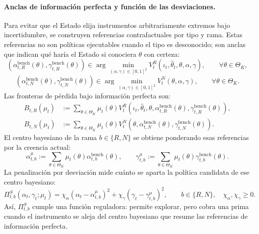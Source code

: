 \documentclass[12pt]{article}
\theoremstyle{definition}
\theoremstyle{remark}
\newcommand{\1}{\mathbf{1}}
\begin{document}
\paragraph{Anclas de información perfecta y función de las desviaciones.}
Para evitar que el Estado elija instrumentos arbitrariamente extremos bajo incertidumbre, se construyen referencias contrafactuales por tipo y rama. Estas referencias no son políticas ejecutables cuando el tipo es desconocido; son anclas que indican qué haría el Estado si conociera $\theta$ con certeza:
\begin{equation}
\label{eq:benchmark-rescue-type}
(\alpha_{t,R}^{\mathrm{bench}}(\theta),\gamma_{t,R}^{\mathrm{bench}}(\theta))
\in
\arg\min_{(\alpha,\gamma)\in[0,1]^2}
V_t^R(\iota_t,\hat{\theta}_t,\theta,\alpha,\gamma),
\qquad \forall\theta\in\Theta_K,
\end{equation}
\begin{equation}
\label{eq:benchmark-neg-type}
(\alpha_{t,N}^{\mathrm{bench}}(\theta),\gamma_{t,N}^{\mathrm{bench}}(\theta))
\in
\arg\min_{(\alpha,\gamma)\in[0,1]^2}
V_t^N(\theta,\alpha,\gamma),
\qquad \forall\theta\in\Theta_K.
\end{equation}
Las fronteras de pérdida bajo información perfecta son:
\begin{equation}
\label{eq:benchmark-perfect-info}
\begin{aligned}
B_{t,R}(\mu_t)
&:=
\sum_{\theta\in\Theta_K}\mu_t(\theta)
V_t^R\!\left(\iota_t,\hat{\theta}_t,\theta,
\alpha_{t,R}^{\mathrm{bench}}(\theta),
\gamma_{t,R}^{\mathrm{bench}}(\theta)\right),\\
B_{t,N}(\mu_t)
&:=
\sum_{\theta\in\Theta_K}\mu_t(\theta)
V_t^N\!\left(\theta,
\alpha_{t,N}^{\mathrm{bench}}(\theta),
\gamma_{t,N}^{\mathrm{bench}}(\theta)\right).
\end{aligned}
\end{equation}
El centro bayesiano de la rama $b\in\{R,N\}$ se obtiene ponderando esas referencias por la creencia actual:
\begin{equation}
\label{eq:belief-weighted-policy}
\alpha_{t,b}^{\mu}
:=
\sum_{\theta\in\Theta_K}\mu_t(\theta)\alpha_{t,b}^{\mathrm{bench}}(\theta),
\qquad
\gamma_{t,b}^{\mu}
:=
\sum_{\theta\in\Theta_K}\mu_t(\theta)\gamma_{t,b}^{\mathrm{bench}}(\theta).
\end{equation}
La penalización por desviación mide cuánto se aparta la política candidata de ese centro bayesiano:
\begin{equation}
\label{eq:prima-desviacion}
\Pi_{t,b}^S(\alpha_t,\gamma_t;\mu_t)
=
\chi_\alpha(\alpha_t-\alpha_{t,b}^{\mu})^2
+\chi_\gamma(\gamma_t-\gamma_{t,b}^{\mu})^2,
\qquad b\in\{R,N\},\quad \chi_\alpha,\chi_\gamma\ge 0.
\end{equation}
Así, $\Pi_{t,b}^S$ cumple una función reguladora: permite explorar, pero cobra una prima cuando el instrumento se aleja del centro bayesiano que resume las referencias de información perfecta.
\end{document}

